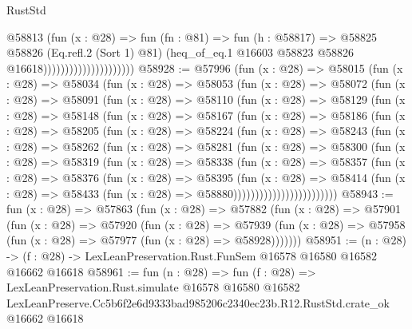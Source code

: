 \begin{lexlean}{RustStd}
\begin{coremodule}
                                        @58813
                                          (fun (x : @28) =>
                                          fun (fn : @81) =>
                                          fun (h : @58817) =>
                                          @58825
                                            @58826
                                            (Eq.refl.{2} (Sort 1) @81)
                                            (heq_of_eq.{1}
                                              @16603
                                              @58823
                                              @58826
                                              @16618)))))))))))))))))))))
@58928 := @57996
    (fun (x : @28) =>
    @58015
      (fun (x : @28) =>
      @58034
        (fun (x : @28) =>
        @58053
          (fun (x : @28) =>
          @58072
            (fun (x : @28) =>
            @58091
              (fun (x : @28) =>
              @58110
                (fun (x : @28) =>
                @58129
                  (fun (x : @28) =>
                  @58148
                    (fun (x : @28) =>
                    @58167
                      (fun (x : @28) =>
                      @58186
                        (fun (x : @28) =>
                        @58205
                          (fun (x : @28) =>
                          @58224
                            (fun (x : @28) =>
                            @58243
                              (fun (x : @28) =>
                              @58262
                                (fun (x : @28) =>
                                @58281
                                  (fun (x : @28) =>
                                  @58300
                                    (fun (x : @28) =>
                                    @58319
                                      (fun (x : @28) =>
                                      @58338
                                        (fun (x : @28) =>
                                        @58357
                                          (fun (x : @28) =>
                                          @58376
                                            (fun (x : @28) =>
                                            @58395
                                              (fun (x : @28) =>
                                              @58414
                                                (fun (x : @28) =>
                                                @58433
                                                  (fun (x : @28) => @58880))))))))))))))))))))))))
@58943 := fun (x : @28) =>
  @57863
    (fun (x : @28) =>
    @57882
      (fun (x : @28) =>
      @57901
        (fun (x : @28) =>
        @57920
          (fun (x : @28) =>
          @57939 (fun (x : @28) => @57958 (fun (x : @28) => @57977 (fun (x : @28) => @58928)))))))
@58951 := (n : @28) ->
  (f : @28) -> LexLeanPreservation.Rust.FunSem @16578 @16580 @16582 @16662 @16618
@58961 := fun (n : @28) =>
  fun (f : @28) =>
  LexLeanPreservation.Rust.simulate
    @16578
    @16580
    @16582
    LexLeanPreserve.Cc5b6f2e6d9333bad985206c2340ec23b.R12.RustStd.crate_ok
    @16662
    @16618
\end{coremodule}
\end{lexlean}
